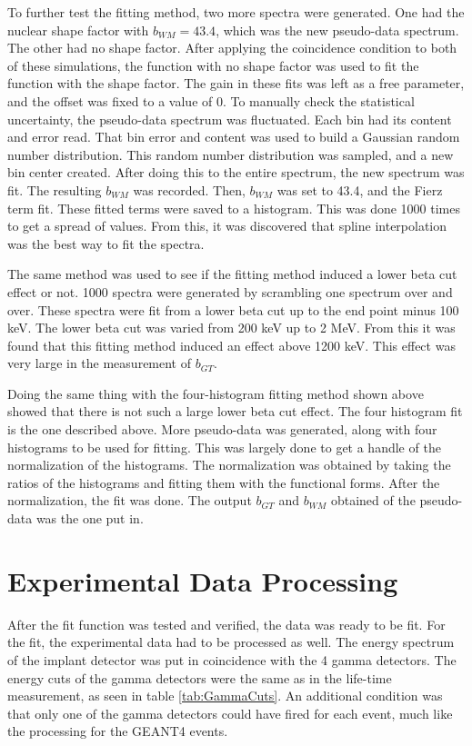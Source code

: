 \documentclass[../MaxHughesThesis.tex]{subfiles}
\begin{document}
To further test the fitting method, two more spectra were generated.
One had the nuclear shape factor with $b_{WM} = 43.4$, which was the new pseudo-data spectrum.  
The other had no shape factor.
After applying the coincidence condition to both of these simulations, the function with no shape factor was used to fit the function with the shape factor. 
The gain in these fits was left as a free parameter, and the offset was fixed to a value of 0. 
To manually check the statistical uncertainty, the pseudo-data spectrum was fluctuated.
Each bin had its content and error read. 
That bin error and content was used to build a Gaussian random number distribution.
This random number distribution was sampled, and a new bin center created.
After doing this to the entire spectrum, the new spectrum was fit.
The resulting $b_{WM}$ was recorded.
Then, $b_{WM}$ was set to 43.4, and the Fierz term fit. 
These fitted terms were saved to a histogram.
This was done 1000 times to get a spread of values.
From this, it was discovered that spline interpolation was the best way to fit the spectra.

The same method was used to see if the fitting method induced a lower beta cut effect or not. 
1000 spectra were generated by scrambling one spectrum over and over.
These spectra were fit from a lower beta cut up to the end point minus 100 keV.
The lower beta cut was varied from 200 keV up to 2 MeV.
From this it was found that this fitting method induced an effect above 1200 keV.
This effect was very large in the measurement of $b_{GT}$.

Doing the same thing with the four-histogram fitting method shown above showed that there is not such a large lower beta cut effect.
The four histogram fit is the one described above. 
More pseudo-data was generated, along with four histograms to be used for fitting.
This was largely done to get a handle of the normalization of the histograms.
The normalization was obtained by taking the ratios of the histograms and fitting them with the functional forms. 
After the normalization, the fit was done.
The output $b_{GT}$ and $b_{WM}$ obtained of the pseudo-data was the one put in.

\section{Experimental Data Processing}
After the fit function was tested and verified, the data was ready to be fit. 
For the fit, the experimental data had to be processed as well. 
The energy spectrum of the implant detector was put in coincidence with the 4 gamma detectors.
The energy cuts of the gamma detectors were the same as in the life-time measurement, as seen in table \ref{tab:GammaCuts}.
An additional condition was that only one of the gamma detectors could have fired for each event, much like the processing for the GEANT4 events.
\end{document}
